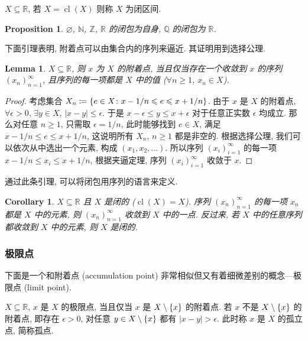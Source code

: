\documentclass[UTF8]{ctexart}
\theoremstyle{mystyle}
\newtheorem{lemma}{Lemma}[section]
\newtheorem{proposition}{Proposition}[section]
\theoremstyle{myremark}
\theoremstyle{plain}
\newtheorem{corollary}{Corollary}[section]
\newcommand{\R}{\mathbb R}
\newcommand{\Z}{\mathbb Z}
\newcommand{\N}{\mathbb N}
\newcommand{\Q}{\mathbb Q}
\DeclarePairedDelimiter\set{\{}{\}}
\DeclareMathOperator{\cl}{cl}
\begin{document}
\begin{definition}
    $ X \subseteq \R $, 若 $ X = \cl(X) $ 则称 $ X $ 为闭区间.
\end{definition}

\begin{proposition}
    $ \varnothing $, $ \N $, $ \Z $, $ \R $ 的闭包为自身, $ \Q $ 的闭包为 $ \R $.
\end{proposition}

下面引理表明, 附着点可以由集合内的序列来逼近. 其证明用到选择公理.
\begin{lemma}
    $ X \subseteq \R $, 则 $ x $ 为 $ X $ 的附着点, 当且仅当存在一个收敛到 $ x $ 的序列 $ (x_n)_{n = 1}^\infty $, 且序列的每一项都是 $ X $ 中的值 ($ \forall n \geqslant 1 $, $ x_n \in X $).
\end{lemma}

\begin{proof}
    考虑集合 $ X_n \coloneqq \set{e \in X \colon x - 1/n \leqslant e \leqslant x + 1/n} $. 由于 $ x $ 是 $ X $ 的附着点, $ \forall \epsilon > 0 $, $ \exists y \in X $, $ |x - y| \leqslant \epsilon $. 于是 $ x - \epsilon \leqslant y \leqslant x + \epsilon $ 对于任意正实数 $ \epsilon $ 均成立. 那么对任意 $ n \geqslant 1 $, 只需取 $ \epsilon = 1/n $, 此时能够找到 $ e \in X $, 满足 $ x - 1/n \leqslant e \leqslant x + 1/n $, 这说明所有 $ X_n $, $ n \geqslant 1 $ 都是非空的. 根据选择公理, 我们可以依次从中选出一个元素, 构成 $ (x_1, x_2, \dots) $. 所以序列 $ (x_i)_{i = 1}^\infty $ 的每一项 $ x - 1/n \leqslant x_i \leqslant x + 1/n $, 根据夹逼定理, 序列 $ (x_i)_{i = 1}^\infty $ 收敛于 $ x $.
\end{proof}

通过此条引理, 可以将闭包用序列的语言来定义.

\begin{corollary}
    $ X \subseteq \R $ 且 $ X $ 是闭的 ($ \cl(X) = X $). 序列 $ (x_n)_{n = 1}^\infty $ 的每一项 $ x_n $ 都是 $ X $ 中的元素, 则 $ (x_n)_{n = 1}^\infty $ 收敛到 $ X $ 中的一点. 反过来, 若 $ X $ 中的任意序列都收敛到 $ X $ 中的元素, 则 $ X $ 是闭的.
\end{corollary}

\subsubsection{极限点}
下面是一个和附着点 (accumulation point) 非常相似但又有着细微差别的概念---极限点 (limit point).

\begin{definition}
    $ X \subseteq \R $, $ x $ 是 $ X $ 的极限点, 当且仅当 $ x $ 是 $ X \setminus \set{x} $ 的附着点. 若 $ x $ 不是 $ X \setminus \set{x} $ 的附着点, 即存在 $ \epsilon > 0 $, 对任意 $ y \in X \setminus \set{x} $ 都有 $ |x - y| > \epsilon $. 此时称 $ x $ 是 $ X $ 的孤立点, 简称孤点.
\end{definition}
\end{document}
